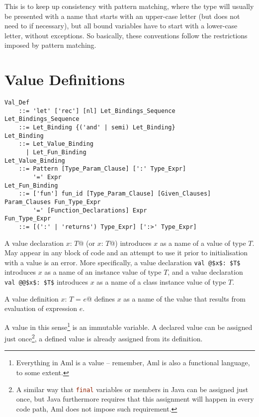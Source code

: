 This is to keep up consistency with pattern matching, where the type will usually be presented with a name that starts with an upper-case letter (but does not need to if necessary), but all bound variables have to start with a lower-case letter, without exceptions. So basically, these conventions follow the restrictions imposed by pattern matching. 





\section{Value Definitions}
\label{sec:value-def}

\grammar\begin{lstlisting}
Val_Def 
    ::= 'let' ['rec'] [nl] Let_Bindings_Sequence
Let_Bindings_Sequence
    ::= Let_Binding {('and' | semi) Let_Binding}
Let_Binding
    ::= Let_Value_Binding
      | Let_Fun_Binding
Let_Value_Binding
    ::= Pattern [Type_Param_Clause] [':' Type_Expr]
        '=' Expr
Let_Fun_Binding
    ::= ['fun'] fun_id [Type_Param_Clause] [Given_Clauses] Param_Clauses Fun_Type_Expr
        '=' [Function_Declarations] Expr
Fun_Type_Expr
    ::= [(':' | 'returns') Type_Expr] [':>' Type_Expr]
\end{lstlisting}

A value declaration \lstinline@let $x$: $T$@ (or \lstinline@let $x$: $T$@) introduces $x$ as a name of a value of type $T$. May appear in any block of code and an attempt to use it prior to initialisation with a value is an error. More specifically, a value declaration \lstinline+val @$x$: $T$+ introduces $x$ as a name of an instance value of type $T$, and a value declaration \lstinline+val @@$x$: $T$+ introduces $x$ as a name of a class instance value of type $T$. 

A value definition \lstinline@val $x$: $T$ = $e$@ defines $x$ as a name of the value that results from evaluation of expression $e$.

A value in this sense\footnote{Everything in Aml is a value -- remember, Aml is also a functional language, to some extent.} is an immutable variable. A declared value can be assigned just once\footnote{A similar way that \lstinline[language=Java]@final@ variables or members in Java can be assigned just once, but Java furthermore requires that this assignment will happen in every code path, Aml does not impose such requirement.}, a defined value is already assigned from its definition. 

